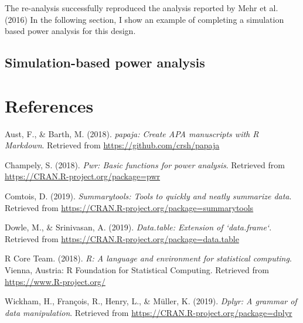 \documentclass[man]{apa6}
\begin{document}
The re-analysis successfully reproduced the analysis reported by Mehr et
al. (2016) In the following section, I show an example of completing a
simulation based power analysis for this design.

\subsection{Simulation-based power
analysis}\label{simulation-based-power-analysis}

\newpage

\section{References}\label{references}

\begingroup
\setlength{\parindent}{-0.5in} \setlength{\leftskip}{0.5in}

\hypertarget{refs}{}
\hypertarget{ref-R-papaja}{}
Aust, F., \& Barth, M. (2018). \emph{papaja: Create APA manuscripts with
R Markdown}. Retrieved from \url{https://github.com/crsh/papaja}

\hypertarget{ref-R-pwr}{}
Champely, S. (2018). \emph{Pwr: Basic functions for power analysis}.
Retrieved from \url{https://CRAN.R-project.org/package=pwr}

\hypertarget{ref-R-summarytools}{}
Comtois, D. (2019). \emph{Summarytools: Tools to quickly and neatly
summarize data}. Retrieved from
\url{https://CRAN.R-project.org/package=summarytools}

\hypertarget{ref-R-data.table}{}
Dowle, M., \& Srinivasan, A. (2019). \emph{Data.table: Extension of
`data.frame`}. Retrieved from
\url{https://CRAN.R-project.org/package=data.table}

\hypertarget{ref-R-base}{}
R Core Team. (2018). \emph{R: A language and environment for statistical
computing}. Vienna, Austria: R Foundation for Statistical Computing.
Retrieved from \url{https://www.R-project.org/}

\hypertarget{ref-R-dplyr}{}
Wickham, H., François, R., Henry, L., \& Müller, K. (2019). \emph{Dplyr:
A grammar of data manipulation}. Retrieved from
\url{https://CRAN.R-project.org/package=dplyr}

\endgroup
\end{document}
